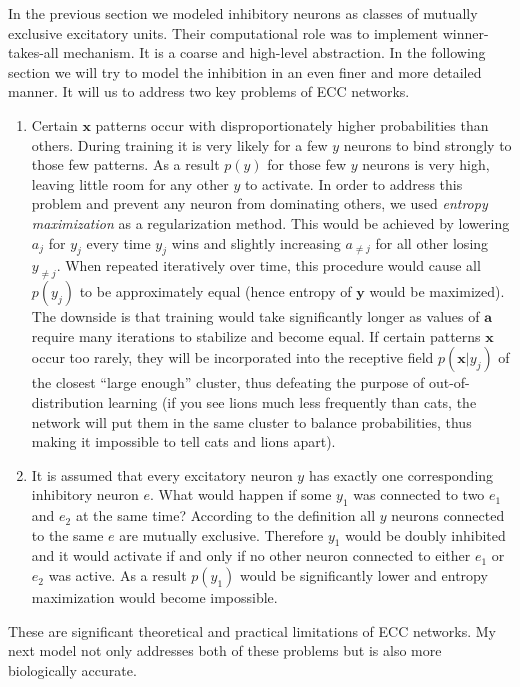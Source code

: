 \documentclass[12pt]{article}
\begin{document}
In the previous section we modeled inhibitory neurons as classes of mutually exclusive excitatory units. Their computational role was to implement winner-takes-all mechanism.
It is a coarse and high-level abstraction. In the following section we will try to model the inhibition in an even finer and more detailed manner. 
It will us to address two key problems of ECC networks. 
\begin{enumerate}
	\item Certain $\boldsymbol{x}$ patterns occur with disproportionately higher probabilities than others. During training it is very likely for a few $y$ neurons to bind strongly to those few patterns. As a result $p(y)$ for those few $y$ neurons is very high, leaving little room for any other $y$ to activate. In order to address this problem and prevent any neuron from dominating others, we used  \textit{entropy maximization} as a regularization method. This would be achieved by lowering $a_j$ for $y_j$ every time $y_j$ wins and slightly increasing $a_{\ne j}$ for all other losing $y_{\ne j}$. When repeated iteratively over time, this procedure would cause all $p(y_j)$ to be approximately equal (hence entropy of $\boldsymbol{y}$ would be maximized). The downside is that training would take significantly longer as values of $\boldsymbol{a}$ require many iterations to stabilize and become equal. If certain patterns $\boldsymbol{x}$ occur too rarely, they will be incorporated into the receptive field $p(\boldsymbol{x}|y_j)$ of the closest ``large enough'' cluster, thus defeating the purpose of out-of-distribution learning (if you see lions much less frequently than cats, the network will put them in the same cluster to balance probabilities, thus making it impossible to tell cats and lions apart). 
	\item It is assumed that every excitatory neuron $y$ has exactly one corresponding inhibitory neuron $e$. What would happen if some $y_1$ was connected to two $e_1$ and $e_2$ at the same time?
	According to the definition all $y$ neurons connected to the same $e$ are mutually exclusive. Therefore $y_1$ would be doubly inhibited and it would activate if and only if no other neuron connected to either $e_1$ or $e_2$ was active. As a result $p(y_1)$ would be significantly lower and entropy maximization would become impossible. 
\end{enumerate}
These are significant theoretical and practical limitations of ECC networks. My next model not only addresses both of these problems but is also more biologically accurate.




    
\end{document}
